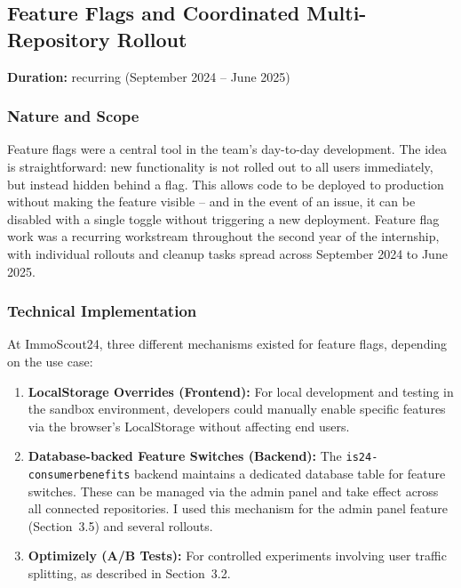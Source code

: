 \documentclass[a4paper, 12pt]{article}
\begin{document}
\subsection{Feature Flags and Coordinated Multi-Repository Rollout}

\noindent\textbf{Duration:} recurring (September 2024 -- June 2025)

\subsubsection*{Nature and Scope}

Feature flags were a central tool in the team's day-to-day development. The idea is
straightforward: new functionality is not rolled out to all users immediately, but
instead hidden behind a flag. This allows code to be deployed to production without
making the feature visible -- and in the event of an issue, it can be disabled with a
single toggle without triggering a new deployment. Feature flag work was a recurring
workstream throughout the second year of the internship, with individual rollouts and
cleanup tasks spread across September 2024 to June 2025.

\subsubsection*{Technical Implementation}

At ImmoScout24, three different mechanisms existed for feature flags, depending on the
use case:

\begin{enumerate}
  \item \textbf{LocalStorage Overrides (Frontend):} For local development and testing
    in the sandbox environment, developers could manually enable specific features via
    the browser's LocalStorage without affecting end users.

  \item \textbf{Database-backed Feature Switches (Backend):} The
    \texttt{is24-consumerbenefits} backend maintains a dedicated database table for
    feature switches. These can be managed via the admin panel and take effect across
    all connected repositories. I used this mechanism for the admin panel feature
    (Section~3.5) and several rollouts.

  \item \textbf{Optimizely (A/B Tests):} For controlled experiments involving user
    traffic splitting, as described in Section~3.2.
\end{enumerate}
\end{document}
